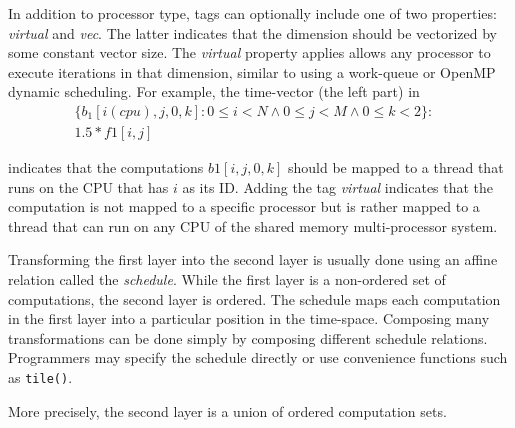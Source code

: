 In addition to processor type, tags can optionally include one of two properties: \emph{virtual} and \emph{vec}.  The latter
indicates that the dimension should be vectorized by some constant vector size.  The \emph{virtual} property applies allows
any processor to execute iterations in that dimension, similar to using a work-queue or OpenMP dynamic scheduling.
For example, the time-\processor vector (the left part) in
\begin{align*}
\{b_1[i (cpu), j, 0, k]:  0\leq i < N \wedge 0\leq j < M \wedge 0 \leq k < 2\}: & \\
1.5*f1[i,j] &
\end{align*}

indicates that the computations $b1[i, j, 0, k]$ should be mapped to a thread that runs on the CPU that has $i$ as its ID.  Adding the tag \emph{virtual} indicates that the computation is not mapped to a specific processor but is rather mapped to a thread that can run on any CPU of the shared memory multi-processor system.

Transforming the first layer into the second layer is usually done using an affine relation called the \emph{schedule}. While the first layer is a non-ordered set of computations, the second layer is ordered.  The schedule maps each computation in the first layer into a particular position in the time-\processor space. Composing many transformations can be done simply by composing different schedule relations.  Programmers may specify the schedule directly or use convenience functions such as \lstinline{tile()}.



More precisely, the second layer is a union of ordered computation sets.


